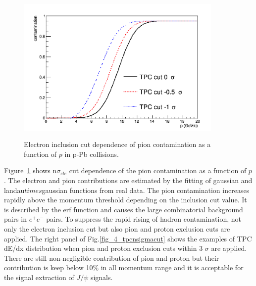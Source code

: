 \begin{figure}[htbp]
  \begin{center}
  \includegraphics[width=10cm]{chap4/figure/PID/hadroncontami_MB.png}
  \label{fig_4_contami}
  \caption{Electron inclusion cut dependence of pion contamination as a function of $p$ in p-Pb collisions.}
  \end{center}
\end{figure}
Figure~\ref{fig_4_contami} shows n$\sigma_{ele}$ cut dependence of the pion contamination as a function of $p$. 
The electron and pion contributions are estimated by the fitting of gaussian and landau$times$gaussian functions from real data. 
The pion contamination increases rapidly above the momentum threshold depending on the inclusion cut value.
It is described by the erf function and causes the large combinatorial background pairs in $e^{+}e^{-}$ pairs. 
To suppress the rapid rising of hadron contamination, not only the electron inclusion cut but also pion and proton exclusion cuts are applied. 
The right panel of Fig.\ref{fig_4_tpcnsigmacut} shows the examples of TPC dE/dx distribution when pion and proton exclusion cuts within 3 $\sigma$ are applied.  
There are still non-negligible contribution of pion and proton but their contribution is keep below 10\% in all momentum range and it is acceptable for the signal extraction of $J/\psi$ signals. 

